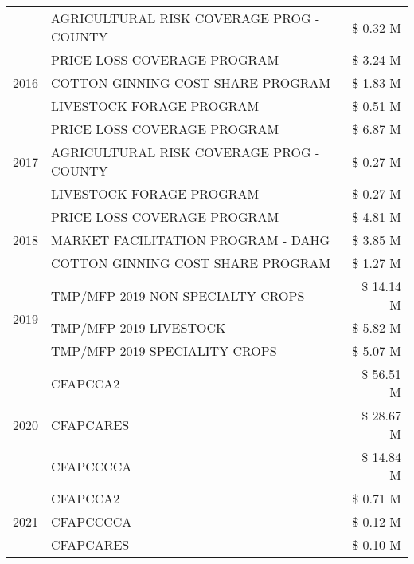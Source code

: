 \begin{tabular}{llr}
 & AGRICULTURAL RISK COVERAGE PROG - COUNTY & \$ 0.32 M \\
\cline{1-3}
\multirow[t]{3}{*}{2016} & PRICE LOSS COVERAGE PROGRAM                   & \$ 3.24 M \\
 & COTTON GINNING COST SHARE PROGRAM             & \$ 1.83 M \\
 & LIVESTOCK FORAGE PROGRAM                      & \$ 0.51 M \\
\cline{1-3}
\multirow[t]{3}{*}{2017} & PRICE LOSS COVERAGE PROGRAM & \$ 6.87 M \\
 & AGRICULTURAL RISK COVERAGE PROG - COUNTY & \$ 0.27 M \\
 & LIVESTOCK FORAGE PROGRAM & \$ 0.27 M \\
\cline{1-3}
\multirow[t]{3}{*}{2018} & PRICE LOSS COVERAGE PROGRAM & \$ 4.81 M \\
 & MARKET FACILITATION PROGRAM - DAHG & \$ 3.85 M \\
 & COTTON GINNING COST SHARE PROGRAM & \$ 1.27 M \\
\cline{1-3}
\multirow[t]{3}{*}{2019} & TMP/MFP 2019 NON SPECIALTY CROPS & \$ 14.14 M \\
 & TMP/MFP 2019 LIVESTOCK & \$ 5.82 M \\
 & TMP/MFP 2019 SPECIALITY CROPS & \$ 5.07 M \\
\cline{1-3}
\multirow[t]{3}{*}{2020} & CFAPCCA2 & \$ 56.51 M \\
 & CFAPCARES & \$ 28.67 M \\
 & CFAPCCCCA & \$ 14.84 M \\
\cline{1-3}
\multirow[t]{3}{*}{2021} & CFAPCCA2 & \$ 0.71 M \\
 & CFAPCCCCA & \$ 0.12 M \\
 & CFAPCARES & \$ 0.10 M \\
\cline{1-3}
\bottomrule
\end{tabular}

